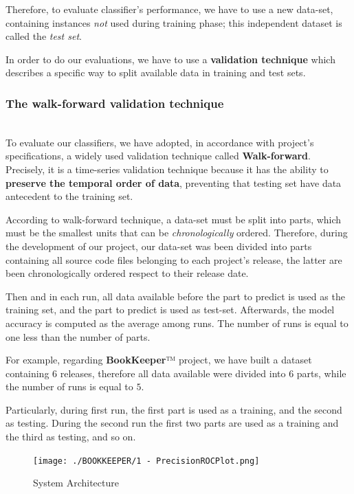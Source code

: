 \documentclass[sigconf]{acmart}
\begin{document}
Therefore, to evaluate classifier's performance, we have to use a new data-set, containing instances \textit{not} used during training phase; this independent dataset is called the \textit{test set}. 

In order to do our evaluations, we have to use a \textbf{validation technique} which describes a specific way to split available data in training and test sets. 

\subsubsection{The walk-forward validation technique}
\hfill\\

To evaluate our classifiers, we have adopted, in accordance with project's specifications, a widely used validation technique called \textbf{Walk-forward}. Precisely, it is a time-series validation technique because it has the ability to \textbf{preserve the temporal order of data}, preventing that testing set have data antecedent to the training set.

According to walk-forward technique, a data-set must be split into parts, which must be the smallest units that can be \textit{chronologically} ordered. Therefore, during the development of our project, our data-set was been divided into parts containing all source code files belonging to each project's release, the latter are been chronologically ordered respect to their release date.

Then and in each run, all data available before the part to predict is used as the training set, and the part to predict is used as test-set. Afterwards, the model accuracy is computed as the average among runs. The number of runs is equal to one less than the number of parts.

For example, regarding \textbf{BookKeeper}™ project, we have built a dataset containing $6$ releases, therefore all data available were divided into $6$ parts, while the number of runs is equal to $5$.

Particularly, during first run, the first part is used as a training, and the second as testing. During the second run the first two parts are used as a training and the third as testing, and so on. 
 

\begin{figure}[h]
  \centering
  \texttt{[image: ./BOOKKEEPER/1 - PrecisionROCPlot.png]}
  \caption{System Architecture}
  \label{fig:BOOKKEEPER:SamplingNoFeatureSelection}
\end{figure}
\end{document}
